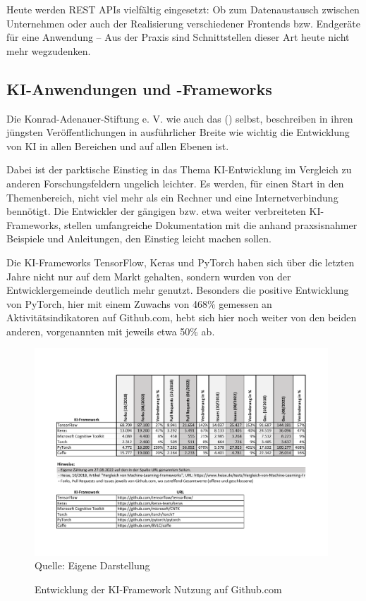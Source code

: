 \documentclass[12pt,oneside,titlepage,listof=totoc,bibliography=totoc]{scrartcl}
\begin{document}
Heute werden REST APIs vielfältig eingesetzt: Ob zum Datenaustausch zwischen Unternehmen oder auch der Realisierung verschiedener Frontends bzw. Endgeräte für eine Anwendung -- Aus der Praxis sind Schnittstellen dieser Art heute nicht mehr wegzudenken. 

\subsection{KI-Anwendungen und -Frameworks}

Die Konrad-Adenauer-Stiftung e. V. \parencite{52-wangermann2020ki} wie auch das \citeauthor[]{53-ki-strat} (\citeyear[]{53-ki-strat}) selbst, beschreiben in ihren jüngsten Veröffentlichungen in ausführlicher Breite wie wichtig die Entwicklung von KI in allen Bereichen und auf allen Ebenen ist.

Dabei ist der parktische Einstieg in das Thema KI-Entwicklung im Vergleich zu anderen Forschungsfeldern ungelich leichter. Es werden, für einen Start in den Themenbereich, nicht viel mehr als ein Rechner und eine Internetverbindung bennötigt. Die Entwickler der gängigen bzw. etwa weiter verbreiteten KI-Frameworks, stellen umfangreiche Dokumentation mit die anhand praxsisnahmer Beispiele und Anleitungen, den Einstieg leicht machen sollen. 

Die KI-Frameworks TensorFlow, Keras und PyTorch haben sich über die letzten Jahre nicht nur auf dem Markt gehalten, sondern wurden von der Entwicklergemeinde deutlich mehr genutzt. Besonders die positive Entwicklung von PyTorch, hier mit einem Zuwachs von 468\% gemessen an Aktivitätsindikatoren auf Github.com, hebt sich hier noch weiter von den beiden anderen, vorgenannten mit jeweils etwa 50\% ab. 

\begin{figure}[H]
	\caption{Entwicklung der KI-Framework Nutzung auf Github.com}\label{fig:ki-framework-nutzung}
	\includegraphics[width=0.98\textwidth]{ki-framework-nutzung.pdf}
	\\
	Quelle: Eigene Darstellung
\end{figure}
\end{document}
